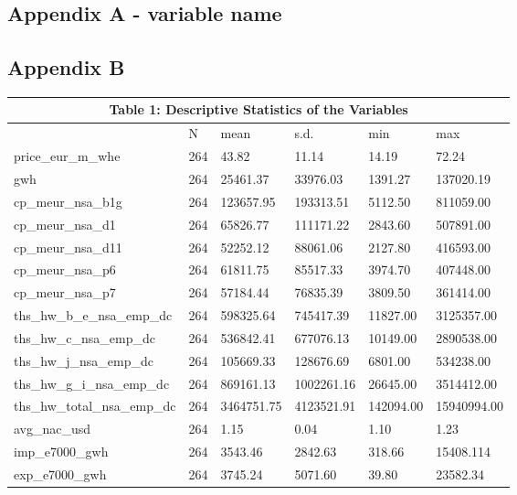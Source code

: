 \documentclass[12pt]{article}
\begin{document}
\subsection{Appendix A - variable name}


\newpage

\subsection{Appendix B}
\begin{tabular}{ p{4.2cm} p{2cm} p{2cm} p{2cm} p{2cm} p{2cm}   }

 \multicolumn{6}{c}{Table 1: Descriptive Statistics of the Variables} \\
  \hline
  &N&mean&s.d.&min&max\\
 \hline
 price\_eur\_m\_whe&264&43.82&11.14&14.19&72.24\\
 gwh&264&25461.37&33976.03&1391.27&137020.19\\
cp\_meur\_nsa\_b1g&264&123657.95&193313.51&5112.50&811059.00\\
cp\_meur\_nsa\_d1&264&65826.77&111171.22&2843.60&507891.00\\
cp\_meur\_nsa\_d11&264&52252.12&88061.06&2127.80&416593.00\\
cp\_meur\_nsa\_p6&264&61811.75&85517.33&3974.70&407448.00\\
cp\_meur\_nsa\_p7&264&57184.44&76835.39&3809.50&361414.00\\
ths\_hw\_b\_e\_nsa\_emp\_dc&264&598325.64&745417.39&11827.00&3125357.00\\
ths\_hw\_c\_nsa\_emp\_dc&264&536842.41&677076.13&10149.00&2890538.00\\
ths\_hw\_j\_nsa\_emp\_dc&264&105669.33&128676.69&6801.00&534238.00\\
ths\_hw\_g\_i\_nsa\_emp\_dc&264&869161.13&1002261.16&26645.00&3514412.00\\
ths\_hw\_total\_nsa\_emp\_dc&264&3464751.75&4123521.91&142094.00&15940994.00\\
 avg\_nac\_usd&264&1.15&0.04&1.10&1.23\\
imp\_e7000\_gwh&264&3543.46&2842.63&318.66&15408.114\\
exp\_e7000\_gwh&264&3745.24&5071.60&39.80&23582.34\\
 \hline
\end{tabular}

\newpage
\end{document}

